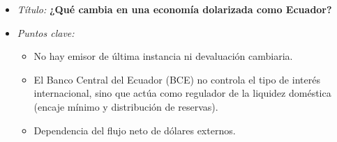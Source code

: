 \documentclass[12pt,spanish]{article}
\providecommand{\tightlist}{%
  \setlength{\itemsep}{0pt}\setlength{\parskip}{0pt}}
\begin{document}
\begin{enumerate}
  \begin{itemize}
  \tightlist
  \item
    \emph{Título:} \textbf{¿Qué cambia en una economía dolarizada como
    Ecuador?}
  \item
    \emph{Puntos clave:}

    \begin{itemize}
    \tightlist
    \item
      No hay emisor de última instancia ni devaluación cambiaria.
    \item
      El Banco Central del Ecuador (BCE) no controla el tipo de interés
      internacional, sino que actúa como regulador de la liquidez
      doméstica (encaje mínimo y distribución de reservas).
    \item
      Dependencia del flujo neto de dólares externos.
    \end{itemize}
  \end{itemize}
\end{enumerate}
\end{document}
